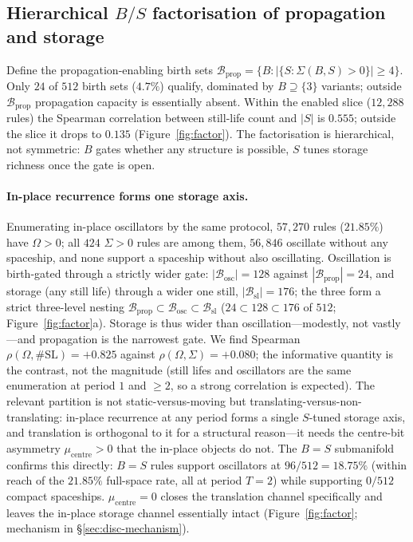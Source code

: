 \documentclass{article}
\begin{document}
\subsection{Hierarchical $B/S$ factorisation of propagation and storage}
\label{sec:results-factor}

Define the propagation-enabling birth sets $\mathcal{B}_{\text{prop}}=\{B:|\{S:
\Sigma(B,S)>0\}|\ge4\}$. Only $24$ of $512$ birth sets ($4.7\%$) qualify,
dominated by $B\supseteq\{3\}$ variants; outside $\mathcal{B}_{\text{prop}}$
propagation capacity is essentially absent. Within the enabled slice ($12{,}288$
rules) the Spearman correlation between still-life count and $|S|$ is $0.555$;
outside the slice it drops to $0.135$ (Figure~\ref{fig:factor}). The factorisation
is hierarchical, not symmetric: $B$ gates whether any structure is possible, $S$
tunes storage richness once the gate is open.

\paragraph{In-place recurrence forms one storage axis.}
Enumerating in-place oscillators by the same protocol, $57{,}270$ rules
($21.85\%$) have $\Omega>0$; all $424$ $\Sigma>0$ rules are among them, $56{,}846$
oscillate without any spaceship, and none support a spaceship without also
oscillating. Oscillation is birth-gated through a strictly wider gate:
$|\mathcal{B}_{\text{osc}}|=128$ against $|\mathcal{B}_{\text{prop}}|=24$,
and storage (any still life) through a wider one still,
$|\mathcal{B}_{\text{sl}}|=176$; the three form a strict three-level
nesting $\mathcal{B}_{\text{prop}}\subset\mathcal{B}_{\text{osc}}
\subset\mathcal{B}_{\text{sl}}$
($24\subset128\subset176$ of $512$; Figure~\ref{fig:factor}a).
Storage is thus wider than oscillation---modestly, not vastly---and
propagation is the narrowest gate. We find
Spearman $\rho(\Omega,\#\mathrm{SL})=+0.825$ against $\rho(\Omega,\Sigma)=+0.080$;
the informative quantity is the contrast, not the magnitude (still lifes and
oscillators are the same enumeration at period $1$ and $\ge2$, so a strong
correlation is expected). The relevant partition is not static-versus-moving but
translating-versus-non-translating: in-place recurrence at any period forms a
single $S$-tuned storage axis, and translation is orthogonal to it for a
structural reason---it needs the centre-bit asymmetry $\mu_{\text{centre}}>0$ that
the in-place objects do not. The $B=S$ submanifold confirms this directly: $B=S$
rules support oscillators at $96/512=18.75\%$ (within reach of the $21.85\%$
full-space rate, all at period $T=2$) while supporting $0/512$ compact spaceships.
$\mu_{\text{centre}}=0$ closes the translation channel specifically and leaves the
in-place storage channel essentially intact (Figure~\ref{fig:factor}; mechanism in
\S\ref{sec:disc-mechanism}).
\end{document}
